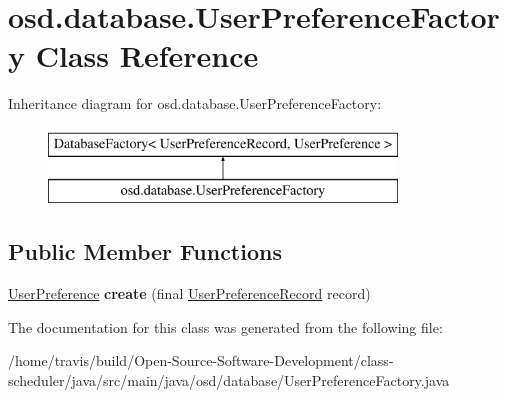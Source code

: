 \hypertarget{classosd_1_1database_1_1_user_preference_factory}{\section{osd.\-database.\-User\-Preference\-Factory Class Reference}
\label{classosd_1_1database_1_1_user_preference_factory}
}
Inheritance diagram for osd.\-database.\-User\-Preference\-Factory\-:\begin{figure}[H]
\begin{center}
\leavevmode
\includegraphics[height=2.000000cm]{classosd_1_1database_1_1_user_preference_factory}
\end{center}
\end{figure}
\subsection*{Public Member Functions}
\begin{DoxyCompactItemize}
\item 
\hypertarget{classosd_1_1database_1_1_user_preference_factory_ab3a50656c26560d1bca36f320aa2e917}{\hyperlink{classosd_1_1considerations_1_1_user_preference}{User\-Preference} {\bfseries create} (final \hyperlink{classosd_1_1database_1_1_user_preference_record}{User\-Preference\-Record} record)}\label{classosd_1_1database_1_1_user_preference_factory_ab3a50656c26560d1bca36f320aa2e917}

\end{DoxyCompactItemize}


The documentation for this class was generated from the following file\-:\begin{DoxyCompactItemize}
\item 
/home/travis/build/\-Open-\/\-Source-\/\-Software-\/\-Development/class-\/scheduler/java/src/main/java/osd/database/User\-Preference\-Factory.\-java\end{DoxyCompactItemize}

